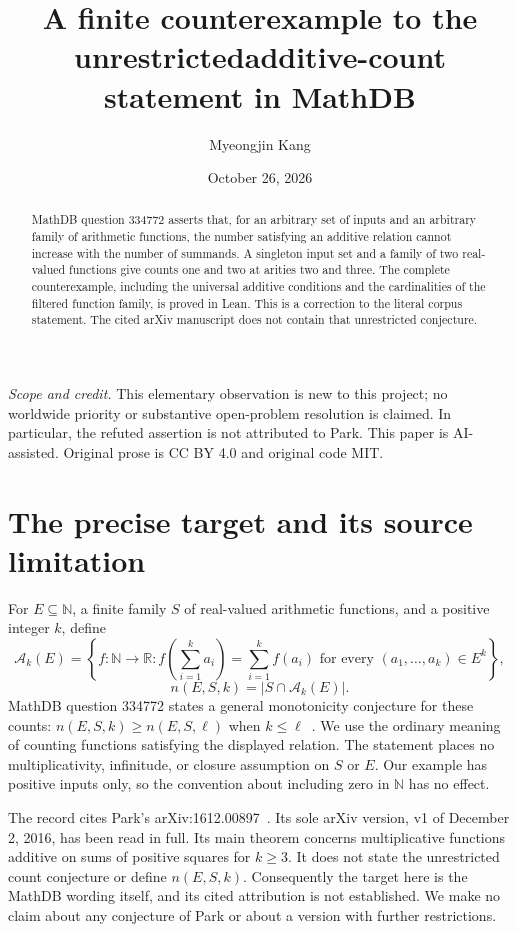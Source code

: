 \documentclass[11pt]{article}
\title{A finite counterexample to the unrestricted\newline additive-count statement in MathDB}
\author{Myeongjin Kang}
\date{October 26, 2026}
\begin{document}
\maketitle
\begin{abstract}
MathDB question 334772 asserts that, for an arbitrary set of inputs and an
arbitrary family of arithmetic functions, the number satisfying an additive
relation cannot increase with the number of summands. A singleton input set
and a family of two real-valued functions give counts one and two at arities
two and three. The complete counterexample, including the universal additive
conditions and the cardinalities of the filtered function family, is proved
in Lean. This is a correction to the literal corpus statement. The cited
arXiv manuscript does not contain that unrestricted conjecture.
\end{abstract}
\noindent\textit{Scope and credit.} This elementary observation is new to
this project; no worldwide priority or substantive open-problem resolution
is claimed. In particular, the refuted assertion is not attributed to Park.
This paper is AI-assisted. Original prose is CC BY 4.0 and original code MIT.

\section{The precise target and its source limitation}
For $E\subseteq\mathbb N$, a finite family $S$ of real-valued arithmetic
functions, and a positive integer $k$, define
\[
 \mathcal A_k(E)=\left\{f:\mathbb N\to\mathbb R:
 f\left(\sum_{i=1}^k a_i\right)=\sum_{i=1}^k f(a_i)
 \text{ for every }(a_1,\ldots,a_k)\in E^k\right\},
\]\[
 n(E,S,k)=|S\cap\mathcal A_k(E)|.
\]
MathDB question 334772 states a general monotonicity conjecture for these
counts: $n(E,S,k)\ge n(E,S,\ell)$ when $k\le\ell$~\cite{MathDB}.
We use the ordinary meaning of counting functions satisfying the displayed
relation. The statement places no multiplicativity, infinitude, or closure
assumption on $S$ or $E$. Our example has positive inputs only, so the
convention about including zero in $\mathbb N$ has no effect.

The record cites Park's arXiv:1612.00897~\cite{Park}. Its sole arXiv version,
v1 of December 2, 2016, has been read in full. Its main theorem concerns
multiplicative functions additive on sums of positive squares for $k\ge3$.
It does not state the unrestricted count conjecture or define $n(E,S,k)$.
Consequently the target here is the MathDB wording itself, and its cited
attribution is not established. We make no claim about any conjecture of
Park or about a version with further restrictions.
\end{document}
